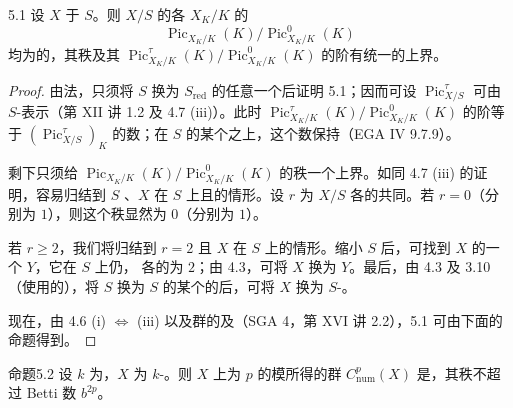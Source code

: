 \begin{SGAresult}{}{5.1}
设 $X$ 于 $S$。则 $X/S$ 的各 $X_K/K$ 的 
\[\operatorname{Pic}_{X_K/K}(K)/\operatorname{Pic}^0_{X_K/K}(K)\]
均为的，其秩及其 $\operatorname{Pic}^\tau_{X_K/K}(K)/\operatorname{Pic}^0_{X_K/K}(K)$ 的阶有统一的上界。
\end{SGAresult}
\begin{proof}
由法，只须将 $S$ 换为 $S_{\mathrm{red}}$ 的任意一个后证明 5.1；因而可设 $\operatorname{Pic}^\tau_{X/S}$ 可由 $S$-表示（第 XII 讲 1.2 及 4.7 (iii)）。此时 $\operatorname{Pic}^\tau_{X_K/K}(K)/\operatorname{Pic}^0_{X_K/K}(K)$ 的阶等于 $(\operatorname{Pic}^\tau_{X/S})_K$ 的数；在 $S$ 的某个之上，这个数保持（EGA IV 9.7.9）。

剩下只须给 $\operatorname{Pic}_{X_K/K}(K)/\operatorname{Pic}^0_{X_K/K}(K)$ 的秩一个上界。如同 4.7 (iii) 的证明，容易归结到 $S$ 、$X$ 在 $S$ 上且的情形。设 $r$ 为 $X/S$ 各的共同。若 $r=0$（分别为 $1$），则这个秩显然为 $0$（分别为 $1$）。

若 $r\geq2$，我们将归结到 $r=2$ 且 $X$ 在 $S$ 上的情形。缩小 $S$ 后，可找到 $X$ 的一个 $Y$，它在 $S$ 上仍，
各的为 $2$；由 4.3，可将 $X$ 换为 $Y$。最后，由 4.3 及 3.10（使用的），将 $S$ 换为 $S$ 的某个的后，可将 $X$ 换为 $S$-。

现在，由 4.6 (i) $\Longleftrightarrow$ (iii) 以及群的及（SGA 4，第 XVI 讲 2.2），5.1 可由下面的命题得到。
\end{proof}
\begin{SGAresult}{命题}{5.2}
设 $k$ 为，$X$ 为 $k$-。则 $X$ 上为 $p$ 的模所得的群 $C^p_{\mathrm{num}}(X)$ 是，其秩不超过 Betti 数 $b^{2p}$。
\end{SGAresult}
